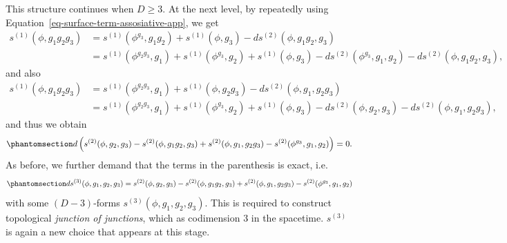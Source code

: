 \documentclass[
  letterpaper,
  DIV=11,
  numbers=noendperiod]{scrreport}
\begin{document}
This structure continues when \(D\ge 3\). At the next level, by
repeatedly using Equation~\ref{eq-surface-term-assosiative-app}, we get
\[
\begin{split}
s^{(1)}(\phi,g_1g_2g_3) &= s^{(1)}(\phi^{g_3},g_1g_2) + s^{(1)}(\phi,g_3) - ds^{(2)}(\phi,g_1g_2,g_3)\\
&= s^{(1)}(\phi^{g_2g_3},g_1) + s^{(1)}(\phi^{g_3},g_2) + s^{(1)}(\phi,g_3) - ds^{(2)}(\phi^{g_3},g_1,g_2) - ds^{(2)}(\phi,g_1g_2,g_3),
\end{split}
\] and also \[
\begin{split}
s^{(1)}(\phi,g_1g_2g_3) &= s^{(1)}(\phi^{g_2g_3},g_1) + s^{(1)}(\phi,g_2g_3) - ds^{(2)}(\phi,g_1,g_2g_3)\\
&= s^{(1)}(\phi^{g_2g_3},g_1) + s^{(1)}(\phi^{g_3},g_2) + s^{(1)}(\phi,g_3) - ds^{(2)}(\phi,g_2,g_3) - ds^{(2)}(\phi,g_1,g_2g_3),
\end{split}
\] and thus we obtain
\begin{equation}\phantomsection\label{eq-surface-term-pentagon-app}{ 
d\left(s^{(2)}(\phi,g_2,g_3) - s^{(2)}(\phi,g_1g_2,g_3) + s^{(2)}(\phi,g_1,g_2g_3) - s^{(2)}(\phi^{g_3},g_1,g_2)\right)=0.
}\end{equation} As before, we further demand that the terms in the
parenthesis is exact, i.e.~
\begin{equation}\phantomsection\label{eq-surface-term-pentagon-app}{ 
ds^{(3)}(\phi,g_1,g_2,g_3) = s^{(2)}(\phi,g_2,g_3) - s^{(2)}(\phi,g_1g_2,g_3) + s^{(2)}(\phi,g_1,g_2g_3) - s^{(2)}(\phi^{g_3},g_1,g_2)
}\end{equation} with some \((D-3)\)-forms \(s^{(3)}(\phi,g_1,g_2,g_3)\).
This is required to construct topological \emph{junction of junctions},
which as codimension \(3\) in the spacetime. \(s^{(3)}\) is again a new
choice that appears at this stage.
\end{document}
